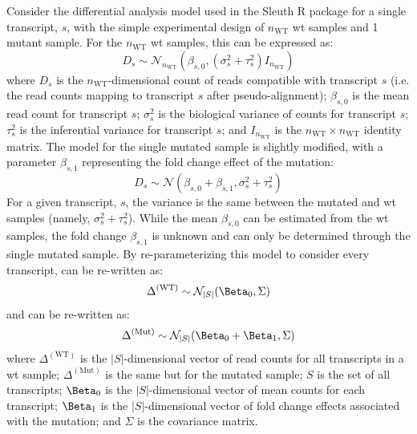 Consider the differential analysis model used in the Sleuth R package \cite{pimentelDifferentialAnalysisRNAseq2017,yiGenelevelDifferentialAnalysis2018} for a single transcript, $s$, with the simple experimental design of $n_\mathrm{WT}$ \gls{wt} samples and 1 mutant sample.
For the $n_\mathrm{WT}$ \gls{wt} samples, this can be expressed as:
%
\begin{equation}
  D_s \sim \mathcal{N}_{n_\mathrm{WT}} \left( \beta_{s,0}, (\sigma_s^2 + \tau_s^2)I_{n_\mathrm{WT}} \right)
  \label{eqn:wt_model}
\end{equation}
%
where $D_s$ is the $n_\mathrm{WT}$-dimensional count of reads compatible with transcript $s$ (i.e. the read counts mapping to transcript $s$ after pseudo-alignment); $\beta_{s,0}$ is the mean read count for transcript $s$; $\sigma_s^2$ is the biological variance of counts for transcript $s$; $\tau_s^2$ is the inferential variance for transcript $s$; and $I_{n_\mathrm{WT}}$ is the ${n_\mathrm{WT}} \times {n_\mathrm{WT}}$ identity matrix.
The model for the single mutated sample is slightly modified, with a parameter $\beta_{s,1}$ representing the fold change effect of the mutation:
%
\begin{equation}
  D_s \sim \mathcal{N} \left( \beta_{s, 0} + \beta_{s, 1}, \sigma_s^2 + \tau_s^2 \right)
  \label{eqn:single_mut_model}
\end{equation}
%
For a given transcript, $s$, the variance is the same between the mutated and \gls{wt} samples (namely, $\sigma_s^2 + \tau_s^2$).
While the mean $\beta_{s, 0}$ can be estimated from the \gls{wt} samples, the fold change $\beta_{s, 1}$ is unknown and can only be determined through the single mutated sample.
By re-parameterizing this model to consider every transcript,  can be re-written as:
%
\begin{equation}
  \Delta^{(\mathrm{WT})} \sim \mathcal{N}_{|S|}(\Beta_0, \Sigma) \\
  \label{eqn:delta_wt}
\end{equation}
%
and  can be re-written as:
%
\begin{equation}
  \Delta^{(\mathrm{Mut})} \sim \mathcal{N}_{|S|}(\Beta_0 + \Beta_1, \Sigma) \\
  \label{eqn:delta_mut}
\end{equation}
%
where $\Delta^{(\mathrm{WT})}$ is the $|S|$-dimensional vector of read counts for all transcripts in a \gls{wt} sample; $\Delta^{(\mathrm{Mut})}$ is the same but for the mutated sample; $S$ is the set of all transcripts; $\Beta_0$ is the $|S|$-dimensional vector of mean counts for each transcript; $\Beta_1$ is the $|S|$-dimensional vector of fold change effects associated with the mutation; and $\Sigma$ is the covariance matrix.
